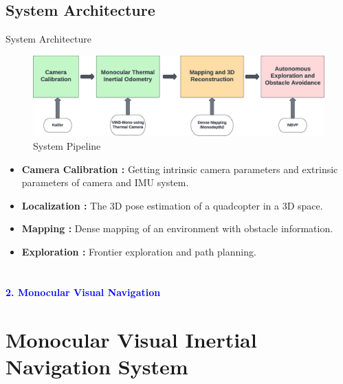\documentclass[10pt]{beamer}
\begin{document}
\subsection*{System Architecture}
\begin{frame}{System Architecture}
    \begin{figure}[h!]
        \centering
        \includegraphics[scale=0.27]{TiHAN_Block_diagram.eps}
        \caption{System Pipeline}
        \label{Fig:System_Archi}
    \end{figure}
    \begin{itemize}
        \item \textbf{Camera Calibration :} Getting intrinsic camera parameters and extrinsic parameters of camera and IMU system.
        \item \textbf{Localization :} The 3D pose estimation of a quadcopter in a 3D space.
        \item \textbf{Mapping :} Dense mapping of an environment with obstacle information.
        \item \textbf{Exploration :} Frontier exploration and path planning.
    \end{itemize}{}
\end{frame}

\section*{}
\begin{frame}{}
    \huge{\centerline{\textcolor{blue}{\textbf{2. Monocular Visual Navigation }}}}
\end{frame}

\section{Monocular Visual Inertial Navigation System}
\end{document}
